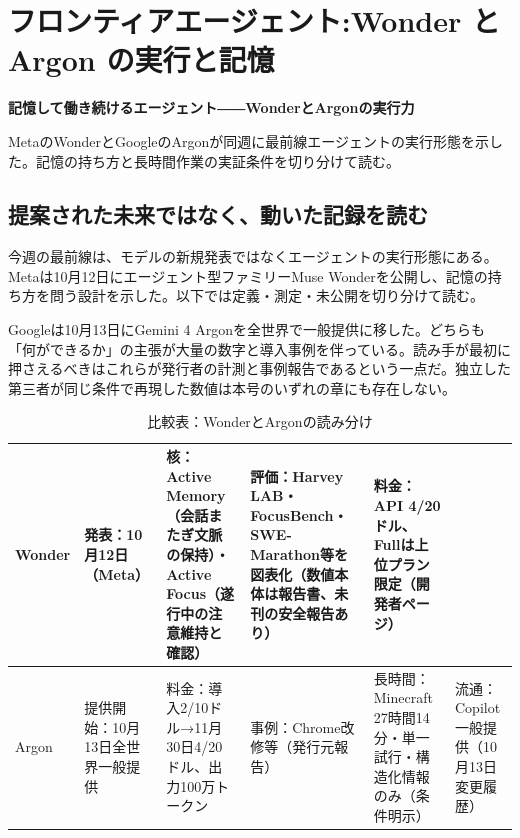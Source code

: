 \documentclass[lualatex,a4paper,10pt]{jlreq}
\begin{document}
\surveycover
\clearpage
\twocolumn
\section{フロンティアエージェント:Wonder と Argon の実行と記憶}
\label{sec:P1}

{\Large\bfseries 記憶して働き続けるエージェント――WonderとArgonの実行力\par}
\smallskip
{\color{SurveyMuted}MetaのWonderとGoogleのArgonが同週に最前線エージェントの実行形態を示した。記憶の持ち方と長時間作業の実証条件を切り分けて読む。\par}
\bigskip

\subsection*{提案された未来ではなく、動いた記録を読む}

今週の最前線は、モデルの新規発表ではなくエージェントの実行形態にある。Metaは10月12日にエージェント型ファミリーMuse Wonderを公開し、記憶の持ち方を問う設計を示した。以下では定義・測定・未公開を切り分けて読む。
\cite{B01,B62,B63,B02,B64,B03}


Googleは10月13日にGemini 4 Argonを全世界で一般提供に移した。どちらも「何ができるか」の主張が大量の数字と導入事例を伴っている。読み手が最初に押さえるべきはこれらが発行者の計測と事例報告であるという一点だ。独立した第三者が同じ条件で再現した数値は本号のいずれの章にも存在しない。
\cite{B05,B65,B08,B04,B07,B06}


\begin{table}[htbp]\centering\footnotesize
\caption{比較表：WonderとArgonの読み分け}
\begin{tabularx}{0.96\linewidth}{@{}lXXXXX@{}}
\toprule
Wonder & 発表：10月12日（Meta） & 核：Active Memory（会話またぎ文脈の保持）・Active Focus（遂行中の注意維持と確認） & 評価：Harvey LAB・FocusBench・SWE-Marathon等を図表化（数値本体は報告書、未刊の安全報告あり） & 料金：API 4/20ドル、Fullは上位プラン限定（開発者ページ） \cite{B01,B62,B63,B02} \\
\midrule
Argon & 提供開始：10月13日全世界一般提供 & 料金：導入2/10ドル→11月30日4/20ドル、出力100万トークン & 事例：Chrome改修等（発行元報告） & 長時間：Minecraft 27時間14分・単一試行・構造化情報のみ（条件明示） & 流通：Copilot一般提供（10月13日変更履歴） \cite{B05,B65,B08,B04} \\
\bottomrule
\end{tabularx}
\end{table}
\end{document}
